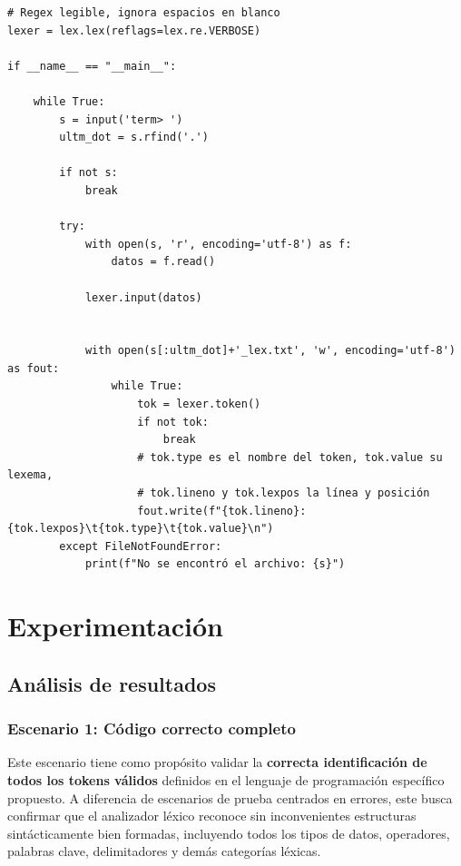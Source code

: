 \documentclass{article}
\begin{document}
\begin{lstlisting}[style=mypython]
# Regex legible, ignora espacios en blanco
lexer = lex.lex(reflags=lex.re.VERBOSE)

if __name__ == "__main__":
    
    while True:
        s = input('term> ')
        ultm_dot = s.rfind('.')

        if not s:
            break

        try:
            with open(s, 'r', encoding='utf-8') as f:
                datos = f.read()

            lexer.input(datos)

            
            with open(s[:ultm_dot]+'_lex.txt', 'w', encoding='utf-8') as fout:
                while True:
                    tok = lexer.token()
                    if not tok:
                        break
                    # tok.type es el nombre del token, tok.value su lexema,
                    # tok.lineno y tok.lexpos la línea y posición
                    fout.write(f"{tok.lineno}:{tok.lexpos}\t{tok.type}\t{tok.value}\n")
        except FileNotFoundError:
            print(f"No se encontró el archivo: {s}")
\end{lstlisting}


\section{Experimentación}\label{sec:exp}

\subsection{Análisis de resultados}

\subsubsection{Escenario 1: Código correcto completo}

Este escenario tiene como propósito validar la 
\textbf{correcta identificación de todos los tokens válidos}
 definidos en el lenguaje de programación específico propuesto. A diferencia de escenarios de prueba centrados en errores, este busca confirmar que el analizador léxico reconoce sin inconvenientes estructuras sintácticamente bien formadas, incluyendo todos los tipos de datos, operadores, palabras clave, delimitadores y demás categorías léxicas.
\end{document}
